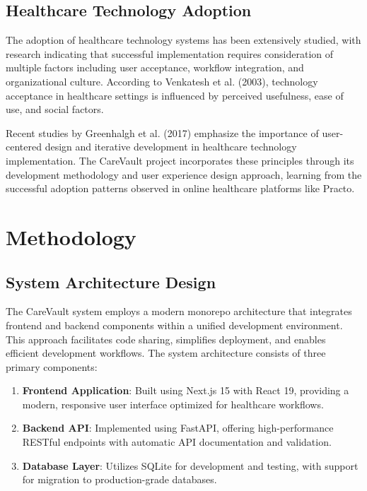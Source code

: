 \documentclass[12pt,a4paper]{article}
\begin{document}
\subsection{Healthcare Technology Adoption}

The adoption of healthcare technology systems has been extensively studied, with research indicating that successful implementation requires consideration of multiple factors including user acceptance, workflow integration, and organizational culture. According to Venkatesh et al. (2003), technology acceptance in healthcare settings is influenced by perceived usefulness, ease of use, and social factors.

Recent studies by Greenhalgh et al. (2017) emphasize the importance of user-centered design and iterative development in healthcare technology implementation. The CareVault project incorporates these principles through its development methodology and user experience design approach, learning from the successful adoption patterns observed in online healthcare platforms like Practo.

\section{Methodology}

\subsection{System Architecture Design}

The CareVault system employs a modern monorepo architecture that integrates frontend and backend components within a unified development environment. This approach facilitates code sharing, simplifies deployment, and enables efficient development workflows. The system architecture consists of three primary components:

\begin{enumerate}
    \item \textbf{Frontend Application}: Built using Next.js 15 with React 19, providing a modern, responsive user interface optimized for healthcare workflows.
    \item \textbf{Backend API}: Implemented using FastAPI, offering high-performance RESTful endpoints with automatic API documentation and validation.
    \item \textbf{Database Layer}: Utilizes SQLite for development and testing, with support for migration to production-grade databases.
\end{enumerate}
\end{document}
